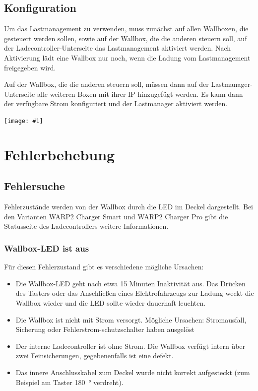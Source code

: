 \documentclass[a4paper,10pt]{article}
\newcommand{\gfx}[1]{\texttt{[image: \#1]}}
\begin{document}
\begin{multicols*}{2}
	\subsection{Konfiguration}
	Um das Lastmanagement zu verwenden, muss zunächst auf allen Wallboxen, die gesteuert werden sollen,
	sowie auf der Wallbox, die die anderen steuern soll, auf der Ladecontroller-Unterseite
	das Lastmanagement aktiviert werden. Nach Aktivierung lädt eine Wallbox nur noch,
	wenn die Ladung vom Lastmanagement freigegeben wird.

	Auf der Wallbox, die die anderen steuern soll, müssen dann auf der Lastmanager-Unterseite
	alle weiteren Boxen mit ihrer IP hinzugefügt werden.
	Es kann dann der verfügbare Strom konfiguriert und der Lastmanager aktiviert werden.

	\gfx{./img_warp2/resized/web_charge_manager}

	\newpage \section{Fehlerbehebung}\label{fehlerbehebung} \subsection{Fehlersuche}
	Fehlerzustände werden von der Wallbox durch die LED im Deckel
	dargestellt. Bei den Varianten WARP2 Charger Smart und WARP2 Charger Pro gibt die Statusseite des Ladecontrollers
	weitere Informationen.

	\subsubsection*{Wallbox-LED ist aus}
	Für diesen Fehlerzustand gibt es verschiedene mögliche Ursachen:
	\begin{itemize}
		\item Die Wallbox-LED geht nach etwa 15 Minuten Inaktivität aus. Das Drücken des Tasters
		      oder das Anschließen eines Elektrofahrzeugs zur Ladung weckt die Wallbox wieder
		      und die LED sollte wieder dauerhaft leuchten.
		\item Die Wallbox ist nicht mit Strom versorgt. Mögliche Ursachen: Stromausfall,
		      Sicherung oder Fehlerstrom-schutzschalter haben ausgelöst
		\item Der interne Ladecontroller ist ohne Strom. Die Wallbox verfügt intern über zwei
		      Feinsicherungen, gegebenenfalls ist eine defekt.
		\item Das innere Anschlusskabel zum Deckel wurde nicht korrekt aufgesteckt (zum Beispiel am Taster \SI{180}{\degree} verdreht).
	\end{itemize}


\end{multicols*}
\end{document}
